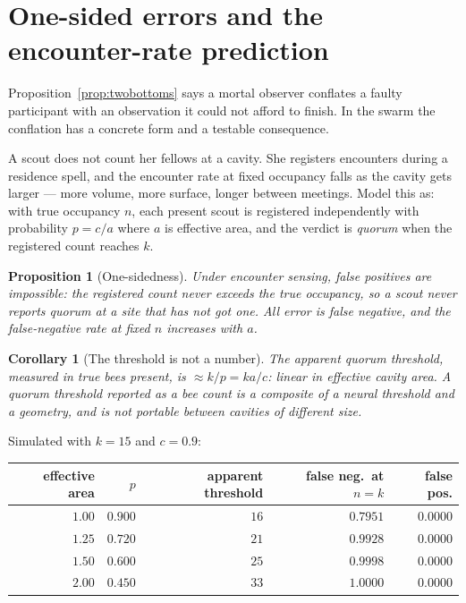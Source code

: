 \documentclass[11pt,a4paper]{article}
\theoremstyle{plain}
\newtheorem{proposition}[theorem]{Proposition}
\newtheorem{corollary}[theorem]{Corollary}
\theoremstyle{definition}
\theoremstyle{remark}
\begin{document}
\section{One-sided errors and the encounter-rate prediction}\label{sec:onesided}

Proposition~\ref{prop:twobottoms} says a mortal observer conflates a faulty
participant with an observation it could not afford to finish. In the swarm
the conflation has a concrete form and a testable consequence.

A scout does not count her fellows at a cavity. She registers encounters during
a residence spell, and the encounter rate at fixed occupancy falls as the
cavity gets larger --- more volume, more surface, longer between meetings. Model
this as: with true occupancy $n$, each present scout is registered
independently with probability $p = c/a$ where $a$ is effective area, and the
verdict is \emph{quorum} when the registered count reaches $k$.

\begin{proposition}[One-sidedness]\label{prop:onesided}
Under encounter sensing, false positives are impossible: the registered count
never exceeds the true occupancy, so a scout never reports quorum at a site
that has not got one. All error is false negative, and the false-negative rate
at fixed $n$ increases with $a$.
\end{proposition}

\begin{corollary}[The threshold is not a number]\label{cor:notanumber}
The \emph{apparent} quorum threshold, measured in true bees present, is
$\approx k/p = ka/c$: linear in effective cavity area. A quorum threshold
reported as a bee count is a composite of a neural threshold and a geometry,
and is not portable between cavities of different size.
\end{corollary}

Simulated with $k = 15$ and $c = 0.9$:

\begin{center}
\begin{tabular}{@{}rrrrr@{}}
\toprule
effective area & $p$ & apparent threshold & false neg.\ at $n=k$ & false pos.\\
\midrule
$1.00$ & $0.900$ & $16$ & $0.7951$ & $0.0000$\\
$1.25$ & $0.720$ & $21$ & $0.9928$ & $0.0000$\\
$1.50$ & $0.600$ & $25$ & $0.9998$ & $0.0000$\\
$2.00$ & $0.450$ & $33$ & $1.0000$ & $0.0000$\\
\bottomrule
\end{tabular}
\end{center}
\end{document}
